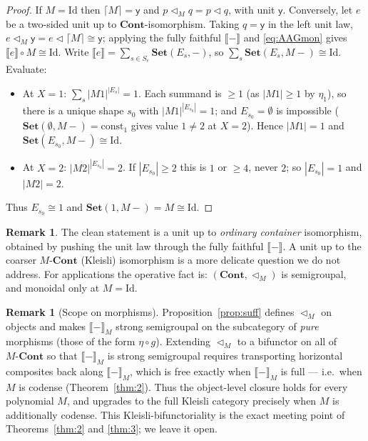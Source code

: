 \documentclass[11pt]{amsart}
\theoremstyle{plain}
\theoremstyle{definition}
\newtheorem{remark}[theorem]{Remark}
\newcommand{\Set}{\mathbf{Set}}
\newcommand{\Cont}{\mathbf{Cont}}
\newcommand{\ext}[1]{\llbracket #1 \rrbracket}
\newcommand{\extM}[1]{\llbracket #1 \rrbracket_{M}}
\newcommand{\Id}{\mathrm{Id}}
\newcommand{\ceil}[1]{\lceil #1 \rceil}
\newcommand{\y}{\mathsf{y}}
\begin{document}
\begin{proof}
If $M=\Id$ then $\ceil M=\y$ and $p\triangleleft_M q=p\triangleleft q$, with unit $\y$. Conversely,
let $e$ be a two-sided unit up to $\Cont$-isomorphism. Taking $q=\y$ in the left unit law,
$e\triangleleft_M\y=e\triangleleft\ceil M\cong\y$; applying the fully faithful $\ext{-}$ and
\eqref{eq:AAGmon} gives $\ext{e}\circ M\cong\Id$. Write $\ext{e}=\sum_{s\in S_e}\Set(E_s,-)$, so
$\sum_{s}\Set(E_s,M{-})\cong\Id$. Evaluate:
\begin{itemize}[leftmargin=1.4em]
\item At $X=1$: $\sum_s|M1|^{|E_s|}=1$. Each summand is $\ge1$ (as $|M1|\ge1$ by $\eta_1$), so there
  is a unique shape $s_0$ with $|M1|^{|E_{s_0}|}=1$; and $E_{s_0}=\emptyset$ is impossible
  ($\Set(\emptyset,M{-})=\mathrm{const}_1$ gives value $1\ne2$ at $X=2$). Hence $|M1|=1$ and
  $\Set(E_{s_0},M{-})\cong\Id$.
\item At $X=2$: $|M2|^{|E_{s_0}|}=2$. If $|E_{s_0}|\ge2$ this is $1$ or $\ge4$, never $2$; so
  $|E_{s_0}|=1$ and $|M2|=2$.
\end{itemize}
Thus $E_{s_0}\cong1$ and $\Set(1,M{-})=M\cong\Id$.
\end{proof}

\begin{remark}
The clean statement is a unit up to \emph{ordinary container} isomorphism, obtained by pushing the
unit law through the fully faithful $\ext{-}$. A unit up to the coarser $M\text{-}\Cont$
(Kleisli) isomorphism is a more delicate question we do not address. For applications the operative
fact is: $(\Cont,\triangleleft_M)$ is semigroupal, and monoidal only at $M=\Id$.
\end{remark}

\begin{remark}[Scope on morphisms]\label{rem:bifun}
Proposition~\ref{prop:suff} defines $\triangleleft_M$ on objects and makes $\extM{-}$ strong
semigroupal on the subcategory of \emph{pure} morphisms (those of the form $\eta\circ g$). Extending
$\triangleleft_M$ to a bifunctor on all of $M\text{-}\Cont$ so that $\extM{-}$ is strong semigroupal
requires transporting horizontal composites back along $\extM{-}$, which is free exactly when
$\extM{-}$ is full --- i.e.\ when $M$ is codense (Theorem~\ref{thm:2}). Thus the object-level closure
holds for every polynomial $M$, and upgrades to the full Kleisli category precisely when $M$ is
additionally codense. This Kleisli-bifunctoriality is the exact meeting point of
Theorems~\ref{thm:2} and \ref{thm:3}; we leave it open.
\end{remark}
\end{document}
